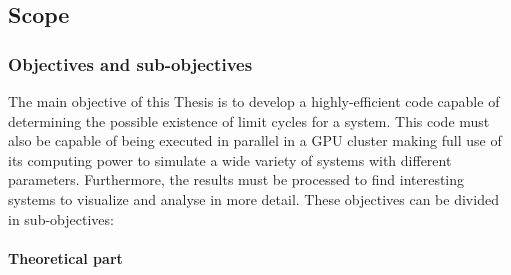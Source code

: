 


\pagebreak
\subsection{Scope}
\subsubsection{Objectives and sub-objectives}

The main objective of this Thesis is to develop a highly-efficient code capable
of determining the possible existence of limit cycles for a system. This code
must also be capable of being executed in parallel in a GPU cluster making full
use of its computing power to simulate a wide variety of systems with different
parameters. Furthermore, the results must be processed to find interesting
systems to visualize and analyse in more detail. These objectives can be divided
in sub-objectives:

\paragraph{Theoretical part}

